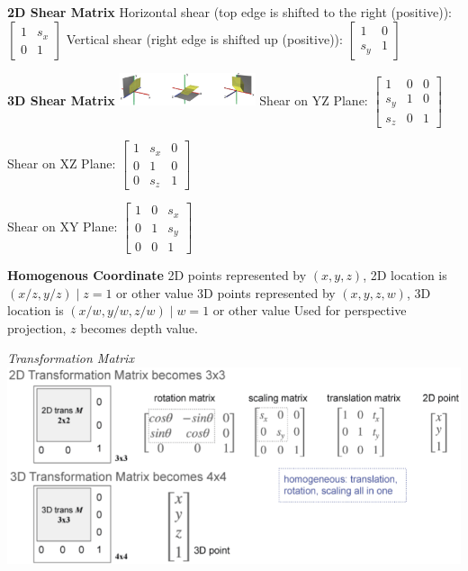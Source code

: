 \documentclass[letterpaper, 8pt]{extarticle}
\begin{document}
\begin{multicols*}{4}
\textbf{2D Shear Matrix}
Horizontal shear (top edge is shifted to the right (positive)):
\(
\begin{bmatrix}
    1 & s_x \\
    0 & 1
\end{bmatrix}
\)
Vertical shear (right edge is shifted up (positive)):
\(
\begin{bmatrix}
    1   & 0 \\
    s_y & 1
\end{bmatrix}
\)

\textbf{3D Shear Matrix}
\includegraphics[width=4cm]{3d-shear.png}
Shear on YZ Plane:
\(
\begin{bmatrix}
    1   & 0 & 0 \\
    s_y & 1 & 0 \\
    s_z & 0 & 1
\end{bmatrix}
\)

Shear on XZ Plane:
\(
\begin{bmatrix}
    1 & s_x & 0 \\
    0 & 1   & 0 \\
    0 & s_z & 1
\end{bmatrix}
\)

Shear on XY Plane:
\(
\begin{bmatrix}
    1 & 0 & s_x \\
    0 & 1 & s_y \\
    0 & 0 & 1
\end{bmatrix}
\)

\textbf{Homogenous Coordinate}
2D points represented by \((x, y, z)\), 2D location is \((x/z, y/z) \mid z=1\) or other value
3D points represented by \((x, y, z, w)\), 3D location is \((x/w, y/w, z/w) \mid w=1\) or other value
Used for perspective projection, \(z\) becomes depth value.

\textit{Transformation Matrix}
\includegraphics[width=\linewidth]{homogenous-coord-transformation-matrix.png}


\end{multicols*}
\end{document}
